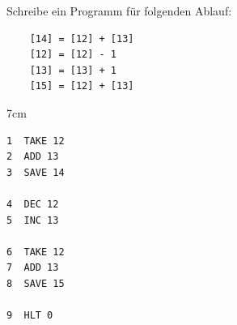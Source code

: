\question[4]
Schreibe ein Programm für folgenden Ablauf:
\begin{verbatim}
    [14] = [12] + [13]
    [12] = [12] - 1
    [13] = [13] + 1
    [15] = [12] + [13]
\end{verbatim}

\begin{solutionbox}{7cm}
\begin{verbatim}
1  TAKE 12
2  ADD 13
3  SAVE 14

4  DEC 12
5  INC 13

6  TAKE 12
7  ADD 13
8  SAVE 15

9  HLT 0
\end{verbatim}
\end{solutionbox}
